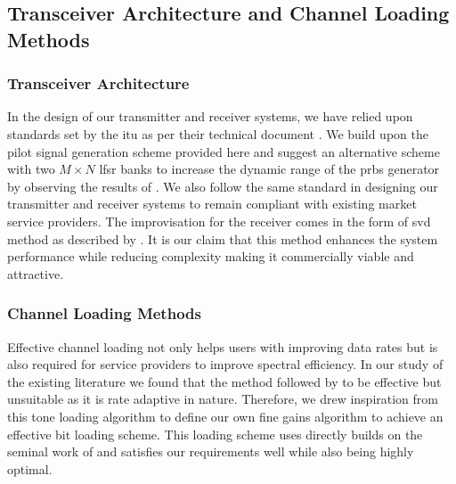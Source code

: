 \subsection{Transceiver Architecture and Channel Loading Methods}
\subsubsection{Transceiver Architecture}
In the design of our transmitter and receiver systems, we have relied upon standards set by the \acrshort{itu} as per their technical document \textcite{ITU2009}. We build upon the \gls{pilot signal} generation scheme provided here and suggest an alternative scheme with two $M \times N$ \acrshort{lfsr} banks to increase the dynamic range of the \acrshort{prbs} generator by observing the results of \textcite{Peinado}. We also follow the same \textcite{ITU} standard in designing our transmitter and receiver systems to remain compliant with existing market service providers. The improvisation for the receiver comes in the form of \acrlong{svd} method as described by \textcite{Klema and Laub}. It is our claim that this method enhances the system performance while reducing complexity making it commercially viable and attractive. 

\subsubsection{Channel Loading Methods}
Effective channel loading not only helps users with improving data rates but is also required for service providers to improve spectral efficiency. In our study of the existing literature we found that the method followed by \textcite{Chow and Bingham} to be effective but unsuitable as it is rate adaptive in nature. Therefore, we drew inspiration from this tone loading algorithm to define our own fine gains algorithm to achieve an effective bit loading scheme. This loading scheme uses directly builds on the seminal work of \textcite{Shannon} and satisfies our requirements well while also being highly optimal.


